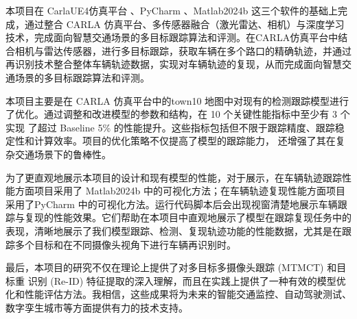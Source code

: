\begin{abstractzh}
	
本项目在 CarlaUE4仿真平台 、PyCharm 、Matlab2024b 这三个软件的基础上完成，通过整合 CARLA 仿真平台、多传感器融合（激光雷达、相机）与深度学习技术，完成面向智慧交通场景的多目标跟踪算法和评测。在CARLA仿真平台中结合相机与雷达传感器，进行多目标跟踪，获取车辆在多个路口的精确轨迹，并通过再识别技术整合整体车辆轨迹数据，实现对车辆轨迹的复现，从而完成面向智慧交通场景的多目标跟踪算法和评测。

本项目主要是在 CARLA 仿真平台中的town10 地图中对现有的检测跟踪模型进行 了优化。通过调整和改进模型的参数和结构，在 10 个关键性能指标中至少有 3 个实现 了超过 Baseline 5\% 的性能提升。这些指标包括但不限于跟踪精度、跟踪稳定性和计算效率。项目的优化策略不仅提高了模型的跟踪能力， 还增强了其在复杂交通场景下的鲁棒性。

为了更直观地展示本项目的设计和现有模型的性能，对于展示，在车辆轨迹跟踪性能方面项目采用了 Matlab2024b 中的可视化方法；在车辆轨迹复现性能方面项目采用了PyCharm 中的可视化方法。运行代码脚本后会出现视窗清楚地展示车辆跟踪与复现的性能效果。它们帮助在本项目中直观地展示了模型在跟踪复现任务中的表现，清晰地展示了我们模型跟踪、检测、复现轨迹功能的性能数据，尤其是在跟踪多个目标和在不同摄像头视角下进行车辆再识别时。

最后，本项目的研究不仅在理论上提供了对多目标多摄像头跟踪 (MTMCT) 和目标重 识别 (Re-ID) 特征提取的深入理解，而且在实践上提供了一种有效的模型优化和性能评估方法。我相信，这些成果将为未来的智能交通监控、自动驾驶测试、数字孪生城市等方面提供有力的技术支持。


\end{abstractzh}
